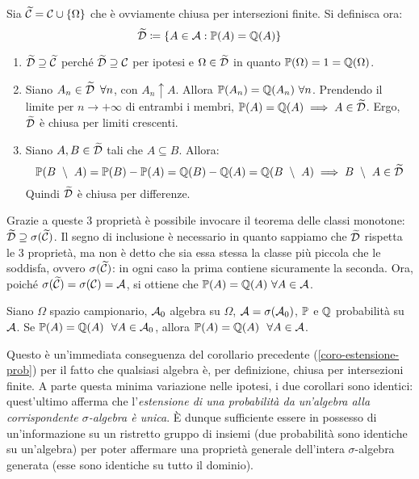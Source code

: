 \begin{dimo}
  Sia $\widetilde{\mathcal C} = \mathcal C \cup \{\Omega\}$ che è ovviamente chiusa per intersezioni finite. Si definisca ora:
  $$\widetilde{\mathcal D} \coloneqq \left \{ A \in \mathcal A: \mathbb P(A) = \mathbb Q(A) \right \}$$
  \leavevmode
  \begin{enumerate}
    \item $\widetilde{\mathcal D} \supseteq \widetilde{\mathcal C}$ perché $\widetilde{\mathcal D} \supseteq \mathcal C$ per ipotesi e $\Omega \in \widetilde{\mathcal D}$ in quanto $\mathbb P( \Omega) = 1 = \mathbb Q(\Omega)$.
    \item Siano $A_n \in \widetilde{\mathcal D} \enspace \forall n$, con $A_n \uparrow A$. Allora $\mathbb P(A_n) = \mathbb Q(A_n) \ \forall n$. Prendendo il limite per $n \to +\infty$ di entrambi i membri, $\mathbb P(A) = \mathbb Q(A) \implies A \in \widetilde{\mathcal D}$. Ergo, $\widetilde{\mathcal D}$ è chiusa per limiti crescenti.
    \item Siano $A, B \in \widetilde{\mathcal D}$ tali che $A \subseteq B$. Allora:
    $$\mathbb P( B \ \setminus \ A) = \mathbb P(B) - \mathbb P(A) = \mathbb Q(B) -\mathbb Q(A) = \mathbb Q( B \ \setminus \ A) \implies B \ \setminus \ A \in \widetilde{\mathcal D}$$
    Quindi  $\widetilde{\mathcal D}$ è chiusa per differenze.
  \end{enumerate}
  Grazie a queste 3 proprietà è possibile invocare il teorema delle classi monotone: $\widetilde{\mathcal D} \supseteq \sigma(\widetilde{\mathcal C})$. Il segno di inclusione è necessario in quanto sappiamo che $\widetilde{\mathcal D}$ rispetta le 3 proprietà, ma non è detto che sia essa stessa la classe più piccola che le soddisfa, ovvero $\sigma(\widetilde{\mathcal C})$: in ogni caso la prima contiene sicuramente la seconda. Ora, poiché $\sigma(\widetilde{\mathcal C}) = \sigma(\mathcal C) = \mathcal A$, si ottiene che $\PP(A) = \QQ(A) \ \forall A \in \Ac$. \qedhere
\end{dimo}

\medskip
\begin{coro}
  Siano $\Omega$ spazio campionario, $\mathcal A_0$ algebra su $\Omega$, $\mathcal A = \sigma(\mathcal A_0)$, $\mathbb P$ e $\mathbb Q$ probabilità su $\mathcal A$.
  Se $\mathbb P(A) = \mathbb Q(A) \ \ \forall A \in \mathcal A_0$, allora $\mathbb P(A) = \mathbb Q(A) \ \ \forall A \in \mathcal A$.
\end{coro}
Questo è un'immediata conseguenza del corollario precedente (\ref{coro-estensione-prob}) per il fatto che qualsiasi algebra è, per definizione, chiusa per intersezioni finite.
A parte questa minima variazione nelle ipotesi, i due corollari sono identici: quest'ultimo afferma che l'\emph{estensione di una probabilità da un'algebra alla corrispondente $\sigma$-algebra è unica}.
È dunque sufficiente essere in possesso di un'informazione su un ristretto gruppo di insiemi (due probabilità sono identiche su un'algebra) per poter affermare una proprietà generale dell'intera $\sigma$-algebra generata (esse sono identiche su tutto il dominio).

